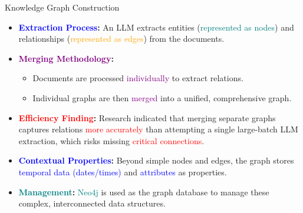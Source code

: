 \documentclass[aspectratio=169,xcolor=dvipsnames]{beamer}
\begin{document}
	\begin{frame}{Knowledge Graph Construction}
		
		\small
		\begin{itemize}
			
			\item \textbf{\textcolor{blue}{Extraction Process}:}
			An LLM extracts entities
			(\textcolor{teal}{represented as nodes})
			and relationships
			(\textcolor{orange}{represented as edges})
			from the documents.
			
			\vspace{0.15cm}
			
			\item \textbf{\textcolor{purple}{Merging Methodology}:}
			\begin{itemize}
				\item Documents are processed
				\textcolor{purple}{individually}
				to extract relations.
				\item Individual graphs are then
				\textcolor{purple}{merged}
				into a unified, comprehensive graph.
			\end{itemize}
			
			\vspace{0.15cm}
			
			\item \textbf{\textcolor{red}{Efficiency Finding}:}
			Research indicated that merging separate graphs captures relations
			\textcolor{red}{more accurately} than attempting a single
			large-batch LLM extraction, which risks missing
			\textcolor{red}{critical connections}.
			
			\vspace{0.15cm}
			\item \textbf{\textcolor{blue}{Contextual Properties}:}
			Beyond simple nodes and edges, the graph stores
			\textcolor{blue}{temporal data (dates/times)} and
			\textcolor{blue}{attributes} as properties.
			
			\vspace{0.15cm}
			
			\item \textbf{\textcolor{teal}{Management}:}
			\textcolor{teal}{Neo4j} is used as the graph database to manage
			these complex, interconnected data structures.
			
		\end{itemize}
		
	\end{frame}
	
\end{document}
